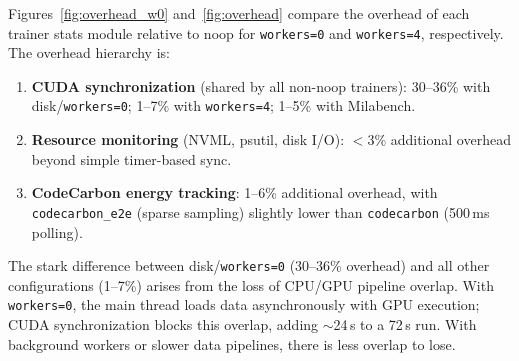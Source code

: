 \documentclass[10pt,twocolumn]{article}
\begin{document}
Figures~\ref{fig:overhead_w0} and~\ref{fig:overhead} compare the overhead of each trainer stats module relative to noop for \texttt{workers=0} and \texttt{workers=4}, respectively. The overhead hierarchy is:
\begin{enumerate}
    \item \textbf{CUDA synchronization} (shared by all non-noop trainers): 30--36\% with disk/\texttt{workers=0}; 1--7\% with \texttt{workers=4}; 1--5\% with Milabench.
    \item \textbf{Resource monitoring} (NVML, psutil, disk I/O): $<$3\% additional overhead beyond simple timer-based sync.
    \item \textbf{CodeCarbon energy tracking}: 1--6\% additional overhead, with \texttt{codecarbon\_e2e} (sparse sampling) slightly lower than \texttt{codecarbon} (500\,ms polling).
\end{enumerate}

The stark difference between disk/\texttt{workers=0} (30--36\% overhead) and all other configurations (1--7\%) arises from the loss of CPU/GPU pipeline overlap. With \texttt{workers=0}, the main thread loads data asynchronously with GPU execution; CUDA synchronization blocks this overlap, adding $\sim$24\,s to a 72\,s run. With background workers or slower data pipelines, there is less overlap to lose.

\newlength{\figw}\setlength{\figw}{0.48\textwidth}
\end{document}
